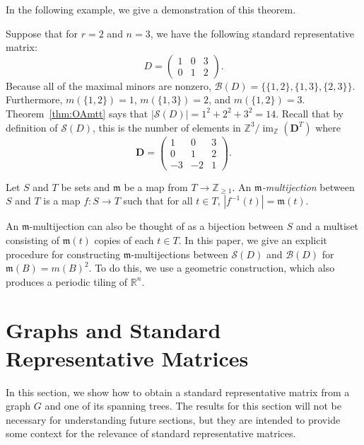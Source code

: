 \documentclass[ALCO,ThmDefs,Unicode,epreuves]{cedram}
\newcommand{\R}{\mathbb{R}}
\newcommand{\Z}{\mathbb{Z}}
\newcommand{\D}{\mathbf{D}}
\newcommand{\B}{\mathcal{B}}
\newcommand{\Sand}{\mathcal{S}}
\DeclareMathOperator{\Ima}{im}
\begin{document}
In the following example, we give a demonstration of this theorem. 
\begin{exam}\label{ex:fave0}
Suppose that for $r=2$ and $n=3$, we have the following standard representative matrix:
\[
 D = \begin{pmatrix}1 & 0 & 3\\ 0 & 1 & 2\end{pmatrix}.
\]
Because all of the maximal minors are nonzero, $\B(D) = \{\{1,2\},\{1,3\},\{2,3\}\}$. Furthermore, $m(\{1,2\}) = 1$, $m(\{1,3\}) = 2$, and $m(\{1,2\}) = 3$. Theorem~\ref{thm:OAmtt} says that $|\Sand(D)| = 1^2 + 2^2 + 3^2 = 14$. Recall that by definition of $\Sand(D)$, this is the number of elements in $\Z^3 / \Ima_\Z(\D^T)$ where
\[
 \D = \begin{pmatrix}1 & 0 & 3\\ 0 & 1 & 2\\-3 & -2 & 1\end{pmatrix}.
\]
\end{exam}
\begin{defi}
Let $S$ and $T$ be sets and $\mathfrak m$ be a map from $T \to \Z_{\ge 1}$. An \emph{$\mathfrak m$-multijection} between $S$ and $T$ is a map $f:S \to T$ such that for all $t \in T$, $|f^{-1}(t)| = \mathfrak m(t)$. \end{defi}

An $\mathfrak m$-multijection can also be thought of as a bijection between $S$ and a multiset consisting of $\mathfrak m(t)$ copies of each $t \in T$. In this paper, we give an explicit procedure for constructing $\mathfrak m$-multijections between $\Sand(D)$ and $\B(D)$ for $\mathfrak m(B) = m(B)^2$. To do this, we use a geometric construction, which also produces a periodic tiling of $\R^n$. 

\section{Graphs and Standard Representative Matrices}\label{sec:graphsand}

In this section, we show how to obtain a standard representative matrix from a graph $G$ and one of its spanning trees. The results for this section will not be necessary for understanding future sections, but they are intended to provide some context for the relevance of standard representative matrices. 
\end{document}
